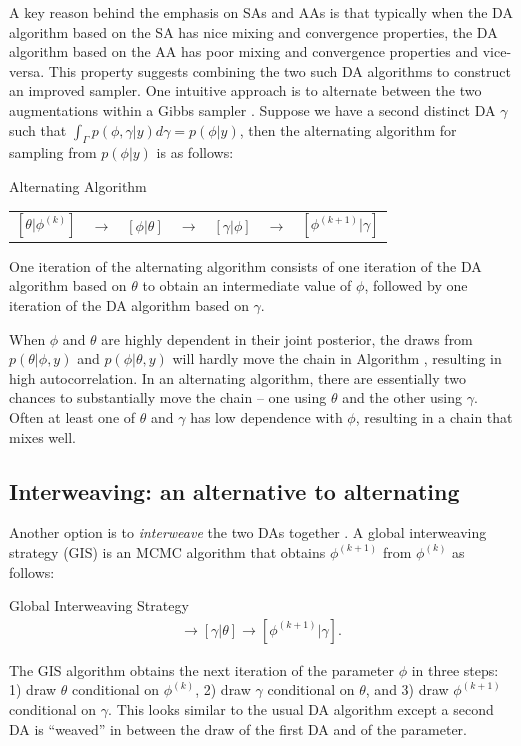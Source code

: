 \documentclass[12pt]{article}
\begin{document}
A key reason behind the emphasis on SAs and AAs is that typically when the DA algorithm based on the SA has nice mixing and convergence properties, the DA algorithm based on the AA has poor mixing and convergence properties and vice-versa. This property suggests combining the two such DA algorithms to construct an improved sampler. One intuitive approach is to alternate between the two augmentations within a Gibbs sampler \citep{papaspiliopoulos2007general}. Suppose we have a second distinct DA $\gamma$ such that $\int_\Gamma p(\phi,\gamma|y)d\gamma = p(\phi|y)$, then the alternating algorithm for sampling from $p(\phi|y)$ is as follows:
\begin{alg*}[Alt]Alternating Algorithm\label{alg:Alt}
  \begin{center}
    \begin{tabular}{lllllll}
  $[\theta|\phi^{(k)}]$& $\to$& $[\phi|\theta]$& $\to$& $[\gamma|\phi]$& $\to$& $[\phi^{(k+1)}|\gamma]$
    \end{tabular}
  \end{center}
\end{alg*}
\noindent One iteration of the alternating algorithm consists of one iteration of the DA algorithm based on $\theta$ to obtain an intermediate value of $\phi$, followed by one iteration of the DA algorithm based on $\gamma$.

When $\phi$ and $\theta$ are highly dependent in their joint posterior, the draws from $p(\theta|\phi,y)$ and $p(\phi|\theta,y)$ will hardly move the chain in Algorithm , resulting in high autocorrelation. In an alternating algorithm, there are essentially two chances to substantially move the chain -- one using $\theta$ and the other using $\gamma$. Often at least one of $\theta$ and $\gamma$ has low dependence with $\phi$, resulting in a chain that mixes well.

\subsection{Interweaving: an alternative to alternating}\label{sec:Intro:int}

Another option is to {\it interweave} the two DAs together \citep{yu2011center}. A global interweaving strategy (GIS) is an MCMC algorithm that obtains $\phi^{(k+1)}$ from $\phi^{(k)}$ as follows:
\begin{alg*}[GIS]Global Interweaving Strategy\label{alg:GIS}
  \begin{align*}
    [\theta|\phi^{(k)}] \to [\gamma|\theta] \to [\phi^{(k+1)}|\gamma].
  \end{align*}
\end{alg*}
\noindent The GIS algorithm obtains the next iteration of the parameter $\phi$ in three steps: 1) draw $\theta$ conditional on $\phi^{(k)}$, 2) draw $\gamma$ conditional on $\theta$, and 3) draw $\phi^{(k+1)}$ conditional on $\gamma$. This looks similar to the usual DA algorithm except a second DA is ``weaved'' in between the draw of the first DA and of the parameter. 
\end{document}
